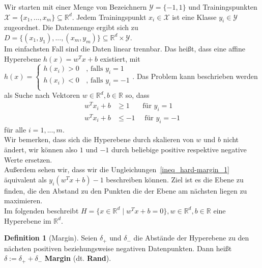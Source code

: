 \documentclass{article}
\theoremstyle{plain}
\theoremstyle{definition}
\newtheorem{dfn}[thm]{Definition}
\begin{document}
    Wir starten mit einer Menge von Bezeichnern ${\mathcal{Y} = \{-1, 1 \}}$ und Trainingspunkten $\mathcal{X} = \{x_1,...,x_m\} \subseteq \mathbb{R}^d$. Jedem Trainingspunkt $x_i \in \mathcal{X}$ ist eine Klasse $y_i \in \mathcal{Y}$ zugeordnet. Die Datenmenge ergibt sich zu $D = \{ (x_1, y_1), ..., (x_m,y_m)\} \subseteq \mathbb{R}^d \times \mathcal{Y}$. \\
    Im einfachsten Fall sind die Daten linear trennbar. Das heißt, dass eine affine Hyperebene $h(x) = w^T x + b$ existiert, mit
    $h(x) = 
    \begin{cases}
         h(x_i) > 0 & \, \textrm{, falls } y_i = 1 \\
         h(x_i) < 0 & \, \textrm{, falls } y_i = -1\\
    \end{cases}$.
    Das Problem kann beschrieben werden als Suche nach Vektoren $w \in \mathbb{R}^d, b \in \mathbb{R}$ so, dass
    \begin{equation}\label{ineq_hard-margin_1}
    \begin{split}
        w^T x_i + b & \geq 1 \enspace \enspace \enspace \text{ für } y_i = 1 \\
        w^T x_i + b & \leq -1 \enspace \enspace \text{ für } y_i = -1
    \end{split}
    \end{equation}
    für alle $i = 1,..., m$. \\
    
    Wir bemerken, dass sich die Hyperebene durch skalieren von $w$ und $b$ nicht ändert, wir können also $1$ und $-1$ durch beliebige positive respektive negative Werte ersetzen. \\
    Außerdem sehen wir, dass wir die Ungleichungen~\ref{ineq_hard-margin_1} äquivalent als $y_i(w^T x + b) - 1$ beschreiben können. Ziel ist es die Ebene zu finden, die den Abstand zu den Punkten die der Ebene am nächsten liegen zu maximieren. \\
    Im folgenden beschreibt $H = \{x \in \mathbb{R}^d \mid w^T x + b = 0\}, w \in \mathbb{R}^d, b \in \mathbb{R}$ eine Hyperebene im $\mathbb{R}^d$.
    \begin{dfn}[Margin]
        Seien $\delta_+$ und $\delta_-$ die Abstände der Hyperebene zu den nächsten positiven beziehungsweise negativen Datenpunkten. Dann heißt $\delta := \delta_+ + \delta_-$ \textbf{Margin} (dt. \textbf{Rand}).
    \end{dfn}
    
\end{document}
